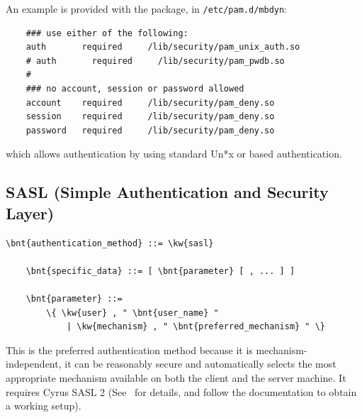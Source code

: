 An example is provided with the package, in  \texttt{/etc/pam.d/mbdyn}:
\begin{verbatim}
    ### use either of the following:
    auth       required     /lib/security/pam_unix_auth.so
    # auth       required     /lib/security/pam_pwdb.so
    #
    ### no account, session or password allowed
    account    required     /lib/security/pam_deny.so
    session    required     /lib/security/pam_deny.so
    password   required     /lib/security/pam_deny.so
\end{verbatim}
which allows authentication by using standard Un*x or  based
authentication.



\subsection{SASL (Simple Authentication and Security Layer)}
\begin{Verbatim}[commandchars=\\\{\}]
    \bnt{authentication_method} ::= \kw{sasl}

    \bnt{specific_data} ::= [ \bnt{parameter} [ , ... ] ]

    \bnt{parameter} ::=
        \{ \kw{user} , " \bnt{user_name} "
            | \kw{mechanism} , " \bnt{preferred_mechanism} " \}
\end{Verbatim}
This is the preferred authentication method because 
it is mechanism-independent, it can be reasonably secure
and automatically selects the most appropriate mechanism available
on both the client and the server machine.
It requires Cyrus SASL 2 (See 
\
for details, and follow the documentation to obtain a working setup).



